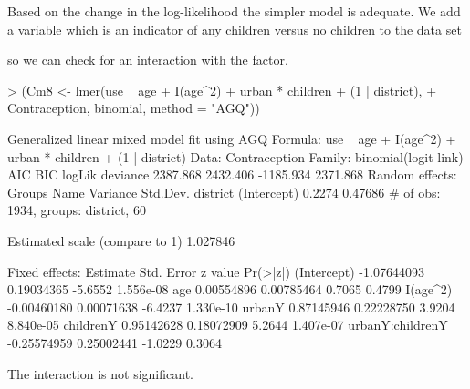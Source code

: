 \documentclass[12pt]{article}
\begin{document}
Based on the change in the log-likelihood the simpler model is
adequate.  We add a variable  which is an indicator of
any children versus no children to the data set
\begin{Schunk}
\end{Schunk}
so we can check for an interaction with the  factor.
\begin{Schunk}
\begin{Sinput}
> (Cm8 <- lmer(use ~ age + I(age^2) + urban * children + (1 | district), 
+     Contraception, binomial, method = "AGQ"))
\end{Sinput}
\begin{Soutput}
Generalized linear mixed model fit using AGQ 
Formula: use ~ age + I(age^2) + urban * children + (1 | district) 
   Data: Contraception 
 Family: binomial(logit link)
      AIC      BIC    logLik deviance
 2387.868 2432.406 -1185.934 2371.868
Random effects:
     Groups        Name    Variance    Std.Dev. 
   district (Intercept)      0.2274     0.47686 
# of obs: 1934, groups: district, 60

Estimated scale (compare to 1)  1.027846 

Fixed effects:
                    Estimate  Std. Error z value  Pr(>|z|)
(Intercept)      -1.07644093  0.19034365 -5.6552 1.556e-08
age               0.00554896  0.00785464  0.7065    0.4799
I(age^2)         -0.00460180  0.00071638 -6.4237 1.330e-10
urbanY            0.87145946  0.22228750  3.9204 8.840e-05
childrenY         0.95142628  0.18072909  5.2644 1.407e-07
urbanY:childrenY -0.25574959  0.25002441 -1.0229    0.3064
\end{Soutput}
\end{Schunk}
The interaction is not significant.
\end{document}
